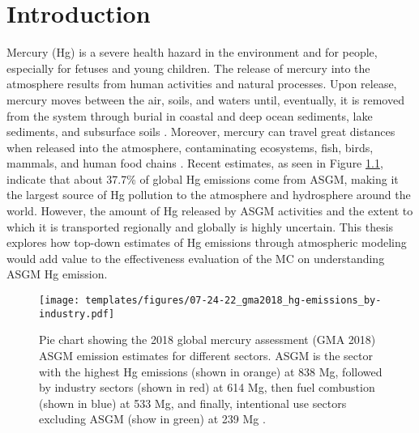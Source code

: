 
\chapter{Introduction}
Mercury (Hg) is a severe health hazard in the environment and for people, especially for fetuses and young children\cite{gibb_mercury_2014}. The release of mercury into the atmosphere results from human activities and natural processes. Upon release, mercury moves between the air, soils, and waters until, eventually, it is removed from the system through burial in coastal and deep ocean sediments, lake sediments, and subsurface soils \cite{esdaile_mercury_2018}. Moreover, mercury can travel great distances when released into the atmosphere, contaminating ecosystems, fish, birds, mammals, and human food chains \cite{esdaile_mercury_2018}. Recent estimates, as seen in Figure \ref{fig:gma2018_hg-emissions_by-industry},  indicate that about 37.7\% of global Hg emissions come from ASGM, making it the largest source of Hg pollution to the atmosphere and hydrosphere around the world\cite{united_nations_environment_programme_technical_2019}. However, the amount of Hg released by ASGM activities and the extent to which it is transported regionally and globally is highly uncertain. This thesis explores how top-down estimates of Hg emissions through atmospheric modeling would add value to the effectiveness evaluation of the MC on understanding ASGM Hg emission. 

\begin{figure}[H]
  \texttt{[image: templates/figures/07-24-22\_gma2018\_hg-emissions\_by-industry.pdf]}
  \centering
  \caption{Pie chart showing the 2018 global mercury assessment (GMA 2018) ASGM \hg emission estimates for different sectors. ASGM is the sector with the highest Hg emissions (shown in orange) at 838 Mg, followed by industry sectors (shown in red) at 614 Mg, then fuel combustion (shown in blue) at 533 Mg, and finally, intentional use sectors excluding ASGM (show in green) at 239 Mg \cite{united_nations_environment_programme_technical_2019}.}
  \label{fig:gma2018_hg-emissions_by-industry}
\end{figure}
\FloatBarrier

